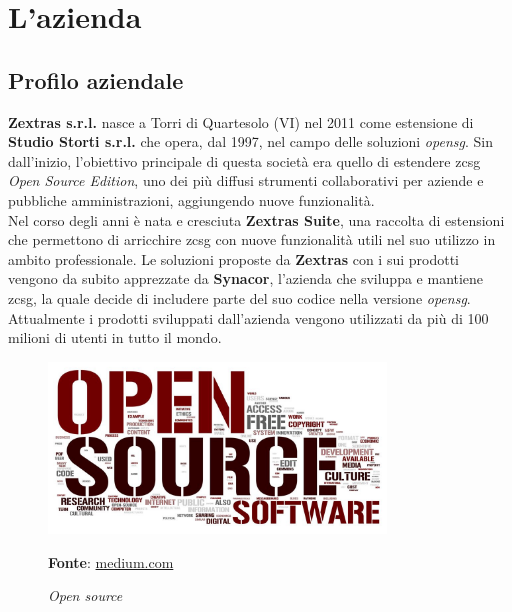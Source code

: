 
\chapter{L'azienda}
\label{cap:azienda}

\section{Profilo aziendale}
    \textbf{Zextras s.r.l.} nasce a Torri di Quartesolo (VI) nel 2011 come estensione di \textbf{Studio Storti s.r.l.} che opera, dal 1997, nel campo delle soluzioni \textit{\gls{opensg}}. Sin dall'inizio, l'obiettivo principale di questa società era quello di estendere \gls{zcsg} \textit{Open Source Edition}, uno dei più diffusi strumenti collaborativi per aziende e pubbliche amministrazioni, aggiungendo nuove funzionalità. \\
    Nel corso degli anni è nata e cresciuta \textbf{Zextras Suite}, una raccolta di estensioni che permettono di arricchire \gls{zcsg} con nuove funzionalità utili nel suo utilizzo in ambito professionale.
    Le soluzioni proposte da \textbf{Zextras} con i sui prodotti vengono da subito apprezzate da \textbf{Synacor}, l'azienda che sviluppa e mantiene \gls{zcsg}, la quale decide di includere parte del suo codice nella versione \textit{\gls{opensg}}. Attualmente i prodotti sviluppati dall'azienda vengono utilizzati da più di 100 milioni di utenti in tutto il mondo.

    \begin{figure}[ht]
            \centering
            \includegraphics[width=0.8\textwidth]{immagini/opensource.jpeg}
            \caption{\textit{Open source}}
            \textbf{Fonte}: \href{https://miro.medium.com/max/2048/1*MnJBb5qalimr1Ji7bKJctQ.jpeg}{medium.com}
            \label{fig: Open source}
        \end{figure}

